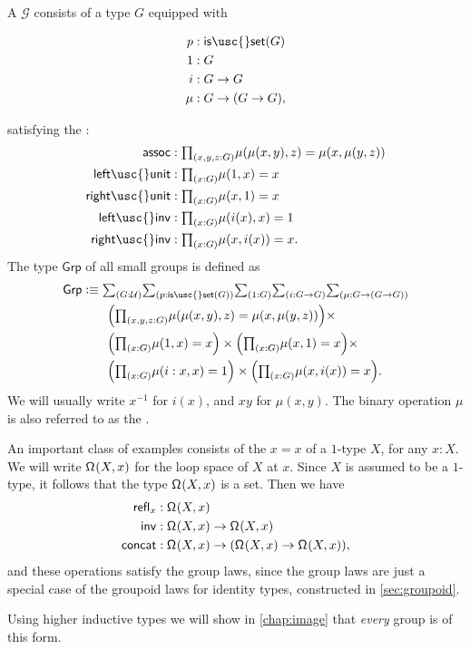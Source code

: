 \begin{defn}
A  $\mathcal{G}$ consists of a type $G$ equipped with
\begin{samepage}
\begin{align*}
p & : \mathsf{is\usc{}set}(G) \\
1 & : G \\
i & : G\to G \\
\mu & : G\to (G\to G),
\end{align*}
\end{samepage}
satisfying the :
\begin{align*}
\mathsf{assoc} & : \prd{x,y,z:G} \mu(\mu(x,y),z)=\mu(x,\mu(y,z)) \\
\mathsf{left\usc{}unit} & : \prd{x:G} \mu(1,x)=x \\
\mathsf{right\usc{}unit} & : \prd{x:G} \mu(x,1)=x \\
\mathsf{left\usc{}inv} & : \prd{x:G} \mu(i(x),x)=1 \\
\mathsf{right\usc{}inv} & : \prd{x:G} \mu(x,i(x))=x.
\end{align*}
The type $\mathsf{Grp}$ of all small groups is defined as
\begin{align*}
\mathsf{Grp} & \defeq \sm{G:\UU}{p:\mathsf{is\usc{}set}(G)}{1:G}{i:G\to G}{\mu:G\to(G\to G)} \\
& \qquad \Big(\prd{x,y,z:G} \mu(\mu(x,y),z)=\mu(x,\mu(y,z))\Big) \times \\
& \qquad \Big(\prd{x:G} \mu(1,x)=x\Big)\times\Big(\prd{x:G} \mu(x,1)=x\Big) \times \\
& \qquad \Big(\prd{x:G} \mu(i:x,x)=1\Big)\times\Big(\prd{x:G} \mu(x,i(x))=x\Big).
\end{align*}
We will usually write $x^{-1}$ for $i(x)$, and $xy$ for $\mu(x,y)$. The binary operation $\mu$ is also referred to as the .
\end{defn}

\begin{eg}
An important class of examples consists of the  $x=x$ of a $1$-type $X$, for any $x:X$. 
We will write $\mathsf{\Omega}^{}(X,x)$ for the loop space of $X$ at $x$. 
Since $X$ is assumed to be a $1$-type, it follows that the type $\mathsf{\Omega}^{}(X,x)$ is a set. Then we have
\begin{align*}
\mathsf{refl}_{x} & : \mathsf{\Omega}^{}(X,x) \\
\mathsf{inv} & : \mathsf{\Omega}^{}(X,x) \to \mathsf{\Omega}^{}(X,x) \\
\mathsf{concat} & : \mathsf{\Omega}^{}(X,x) \to (\mathsf{\Omega}^{}(X,x)\to \mathsf{\Omega}^{}(X,x)),
\end{align*}
and these operations satisfy the group laws, since the group laws are just a special case of the groupoid laws for identity types, constructed in \cref{sec:groupoid}.

Using higher inductive types we will show in \cref{chap:image} that \emph{every} group is of this form.
\end{eg}

